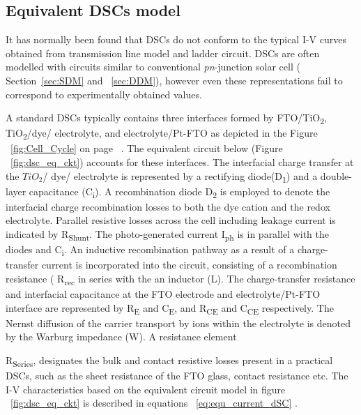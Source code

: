 \subsection{Equivalent DSCs model}\label{sec:eDDM}

It has normally been found that \ac{DSCs} do not conform to the typical I-V curves obtained from transmission line model and ladder circuit\cite{yong2008modeling}. \ac{DSCs} are often modelled with circuits similar to conventional \textit{pn}-junction solar cell ( Section~\ref{sec:SDM} and ~\ref{sec:DDM}), however even these representations fail to correspond to experimentally obtained values.

A standard \ac{DSCs} typically contains three interfaces formed by FTO/TiO\textsubscript{2}, TiO\textsubscript{2}/dye/ electrolyte, and electrolyte/Pt-FTO as depicted in the Figure ~\ref{fig:Cell_Cycle} on page ~\pageref{fig:Cell_Cycle}. The equivalent circuit below (Figure ~\ref{fig:dsc_eq_ckt}) accounts for these interfaces. The interfacial charge transfer at the $TiO_{2}$/ dye/ electrolyte is represented by a rectifying diode(D\textsubscript{1}) and a double-layer capacitance (C\textsubscript{i}). A recombination diode D\textsubscript{2} is employed to denote the interfacial charge recombination losses to both the dye cation and the redox electrolyte. Parallel resistive losses across the cell including leakage current is indicated by R\textsubscript{Shunt}. The photo-generated current I\textsubscript{ph} is in parallel with the diodes and C\textsubscript{i}. An inductive recombination pathway as a result of a charge-transfer current is incorporated into the circuit, consisting of a recombination resistance ( R\textsubscript{rec} in series with the an inductor (L). The charge-transfer resistance and interfacial capacitance at the FTO electrode and electrolyte/Pt-FTO interface are represented by R\textsubscript{E} and C\textsubscript{E}, and R\textsubscript{CE} and C\textsubscript{CE} respectively. The Nernst diffusion of the carrier transport by ions within the electrolyte is denoted by the Warburg impedance (W). A resistance element {R\textsubscript{Series}, designates the bulk and contact resistive losses present in a practical \ac{DSCs}, such as the sheet resistance of the FTO glass, contact resistance etc. The I-V characteristics based on the equivalent circuit model in figure ~\ref{fig:dsc_eq_ckt} is described in equations ~\ref{eq:equ_current_dSC} \cite{yong2008modeling}.
    


}
